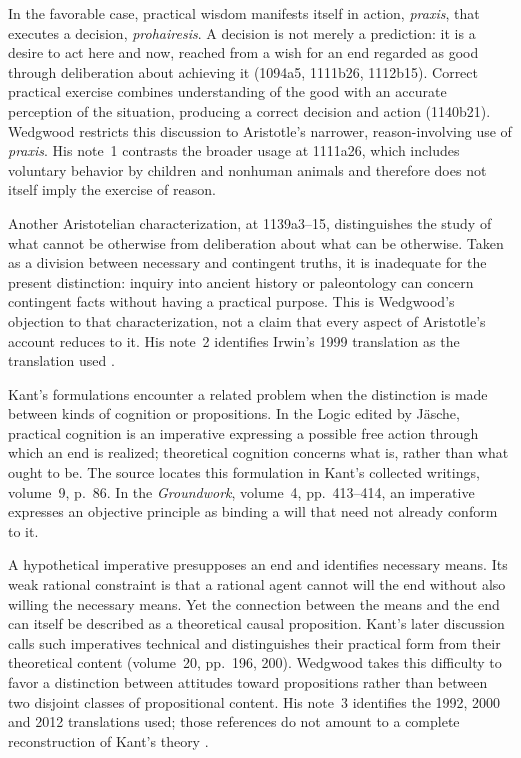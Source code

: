 In the favorable case, practical wisdom manifests itself in action,
\emph{praxis}, that executes a decision, \emph{prohairesis}. A decision is
not merely a prediction: it is a desire to act here and now, reached from a
wish for an end regarded as good through deliberation about achieving it
(1094a5, 1111b26, 1112b15). Correct practical exercise combines understanding
of the good with an accurate perception of the situation, producing a
correct decision and action (1140b21). Wedgwood restricts this discussion to
Aristotle's narrower, reason-involving use of \emph{praxis}. His note~1
contrasts the broader usage at 1111a26, which includes voluntary behavior
by children and nonhuman animals and therefore does not itself imply the
exercise of reason.

Another Aristotelian characterization, at 1139a3--15, distinguishes the
study of what cannot be otherwise from deliberation about what can be
otherwise. Taken as a division between necessary and contingent truths,
it is inadequate for the present distinction: inquiry into ancient
history or paleontology can concern contingent facts without having a
practical purpose. This is Wedgwood's objection to that characterization,
not a claim that every aspect of Aristotle's account reduces to it.
His note~2 identifies Irwin's 1999 translation as the translation used
\parencite[pp.~137--138 and p.~144, nn.~1--2]{RalphWedgwood2021}.

Kant's formulations encounter a related problem when the distinction is
made between kinds of cognition or propositions. In the Logic edited by
J\"asche, practical cognition is an imperative expressing a possible free
action through which an end is realized; theoretical cognition concerns
what is, rather than what ought to be. The source locates this formulation
in Kant's collected writings, volume~9, p.~86. In the \emph{Groundwork},
volume~4, pp.~413--414, an imperative expresses an objective principle as
binding a will that need not already conform to it.

A hypothetical imperative presupposes an end and identifies necessary
means. Its weak rational constraint is that a rational agent cannot will
the end without also willing the necessary means. Yet the connection
between the means and the end can itself be described as a theoretical
causal proposition. Kant's later discussion calls such imperatives
technical and distinguishes their practical form from their theoretical
content (volume~20, pp.~196, 200). Wedgwood takes this difficulty to favor
a distinction between attitudes toward propositions rather than between
two disjoint classes of propositional content. His note~3 identifies the
1992, 2000 and 2012 translations used; those references do not amount to a
complete reconstruction of Kant's theory
\parencite[p.~138 and p.~144, n.~3]{RalphWedgwood2021}.

